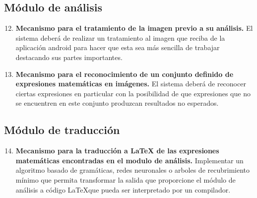     \subsection{Módulo de análisis}
    \begin{enumerate}[label=\textbf{RF\arabic*.}]
    	\setcounter{enumi}{11}
    	\item \textbf{Mecanismo para el tratamiento de la imagen previo a su análisis.} El sistema deberá de realizar un tratamiento al imagen que reciba de la aplicación android para hacer que esta sea más sencilla de trabajar destacando sus partes importantes.
    	\item \textbf{Mecanismo para el reconocimiento de un conjunto definido de expresiones matemáticas en imágenes.} El sistema deberá de reconocer ciertas expresiones en particular con la posibilidad de que expresiones que no se encuentren en este conjunto produzcan resultados no esperados.
    \end{enumerate}
    
    \subsection{Módulo de traducción}
    \begin{enumerate}[label=\textbf{RF\arabic*.}]
    	\setcounter{enumi}{13}
    	\item \textbf{Mecanismo para la traducción a \LaTeX{} de las expresiones matemáticas encontradas en el modulo de análisis.} Implementar un algoritmo basado de gramáticas, redes neuronales o arboles de recubrimiento mínimo que permita transformar la salida que proporcione el módulo de análisis a código \LaTeX que pueda ser interpretado por un compilador.
    \end{enumerate}
    
